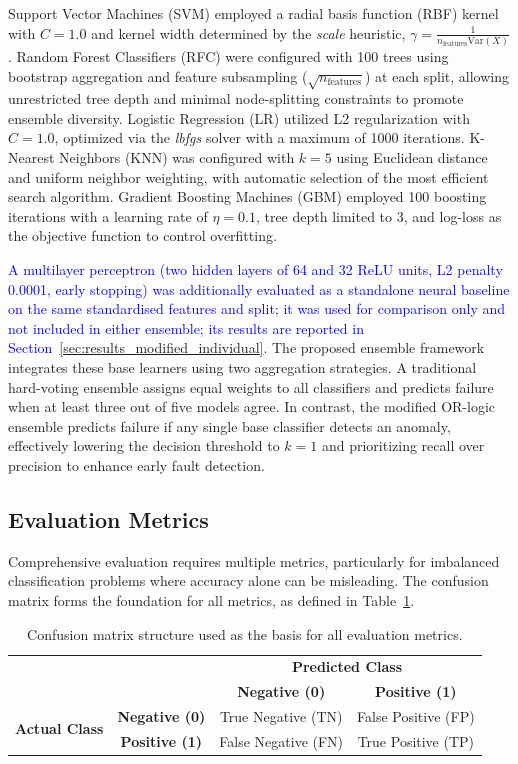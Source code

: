 \documentclass[final,5p, twocolumn]{elsarticle}
\begin{document}
Support Vector Machines (SVM) employed a radial basis function (RBF) kernel with $C = 1.0$ and kernel width determined by the \textit{scale} heuristic, $\gamma = \frac{1}{n_{\text{features}}\mathrm{Var}(X)}$. Random Forest Classifiers (RFC) were configured with 100 trees using bootstrap aggregation and feature subsampling ($\sqrt{n_{\text{features}}}$) at each split, allowing unrestricted tree depth and minimal node-splitting constraints to promote ensemble diversity. Logistic Regression (LR) utilized L2 regularization with $C = 1.0$, optimized via the \textit{lbfgs} solver with a maximum of 1000 iterations. K-Nearest Neighbors (KNN) was configured with $k = 5$ using Euclidean distance and uniform neighbor weighting, with automatic selection of the most efficient search algorithm. Gradient Boosting Machines (GBM) employed 100 boosting iterations with a learning rate of $\eta = 0.1$, tree depth limited to 3, and log-loss as the objective function to control overfitting.

\textcolor{blue}{A multilayer perceptron (two hidden layers of 64 and 32 ReLU units, L2 penalty 0.0001, early stopping) was additionally evaluated as a standalone neural baseline on the same standardised features and split; it was used for comparison only and not included in either ensemble; its results are reported in Section~\ref{sec:results_modified_individual}.} The proposed ensemble framework integrates these base learners using two aggregation strategies. A traditional hard-voting ensemble assigns equal weights to all classifiers and predicts failure when at least three out of five models agree. In contrast, the modified OR-logic ensemble predicts failure if any single base classifier detects an anomaly, effectively lowering the decision threshold to $k=1$ and prioritizing recall over precision to enhance early fault detection.

\subsection{Evaluation Metrics}

Comprehensive evaluation requires multiple metrics, particularly for imbalanced classification problems where accuracy alone can be misleading. The confusion matrix forms the foundation for all metrics, as defined in Table~\ref{tab:confusion_definition}.

\begin{table}[htbp]
\centering
\caption{Confusion matrix structure used as the basis for all evaluation metrics.}
\label{tab:confusion_definition}
\begin{tabular}{cc|cc}
\multicolumn{2}{c}{} & \multicolumn{2}{c}{\textbf{Predicted Class}} \\
\multicolumn{2}{c|}{} & \textbf{Negative (0)} & \textbf{Positive (1)} \\
\hline
\multirow{2}{*}{\textbf{Actual Class}} & \textbf{Negative (0)} & True Negative (TN) & False Positive (FP) \\
& \textbf{Positive (1)} & False Negative (FN) & True Positive (TP) \\
\end{tabular}
\end{table}
\end{document}
